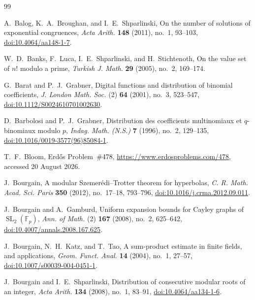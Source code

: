 \documentclass[11pt,reqno]{amsart}
\numberwithin{equation}{section}
\theoremstyle{definition}
\theoremstyle{remark}
\newcommand{\F}{\mathbb F}
\newcommand{\SL}{\operatorname{SL}}
\begin{document}
\small
\begin{thebibliography}{99}

A.~Balog, K.~A.~Broughan, and I.~E.~Shparlinski,
\newblock On the number of solutions of exponential congruences,
\newblock \emph{Acta Arith.} \textbf{148} (2011), no.~1, 93--103,
\newblock \href{https://doi.org/10.4064/aa148-1-7}{doi:10.4064/aa148-1-7}.

W.~D.~Banks, F.~Luca, I.~E.~Shparlinski, and H.~Stichtenoth,
\newblock On the value set of $n!$ modulo a prime,
\newblock \emph{Turkish J. Math.} \textbf{29} (2005), no.~2, 169--174.

G.~Barat and P.~J.~Grabner,
\newblock Digital functions and distribution of binomial coefficients,
\newblock \emph{J. London Math. Soc.} (2) \textbf{64} (2001), no.~3, 523--547,
\newblock \href{https://doi.org/10.1112/S0024610701002630}{doi:10.1112/S0024610701002630}.

D.~Barbolosi and P.~J.~Grabner,
\newblock Distribution des coefficients multinomiaux et $q$-binomiaux modulo $p$,
\newblock \emph{Indag. Math. (N.S.)} \textbf{7} (1996), no.~2, 129--135,
\newblock \href{https://doi.org/10.1016/0019-3577(96)85084-1}{doi:10.1016/0019-3577(96)85084-1}.

T.~F.~Bloom,
\newblock Erd\H{o}s Problem~\#478,
\newblock \url{https://www.erdosproblems.com/478}, accessed 20 August 2026.

J.~Bourgain,
\newblock A modular Szemer\'edi--Trotter theorem for hyperbolas,
\newblock \emph{C. R. Math. Acad. Sci. Paris} \textbf{350} (2012), no.~17--18, 793--796,
\newblock \href{https://doi.org/10.1016/j.crma.2012.09.011}{doi:10.1016/j.crma.2012.09.011}.

J.~Bourgain and A.~Gamburd,
\newblock Uniform expansion bounds for Cayley graphs of $\SL_2(\F_p)$,
\newblock \emph{Ann. of Math.} (2) \textbf{167} (2008), no.~2, 625--642,
\newblock \href{https://doi.org/10.4007/annals.2008.167.625}{doi:10.4007/annals.2008.167.625}.

J.~Bourgain, N.~H.~Katz, and T.~Tao,
\newblock A sum-product estimate in finite fields, and applications,
\newblock \emph{Geom. Funct. Anal.} \textbf{14} (2004), no.~1, 27--57,
\newblock \href{https://doi.org/10.1007/s00039-004-0451-1}{doi:10.1007/s00039-004-0451-1}.

J.~Bourgain and I.~E.~Shparlinski,
\newblock Distribution of consecutive modular roots of an integer,
\newblock \emph{Acta Arith.} \textbf{134} (2008), no.~1, 83--91,
\newblock \href{https://doi.org/10.4064/aa134-1-6}{doi:10.4064/aa134-1-6}.


\end{thebibliography}
\end{document}

